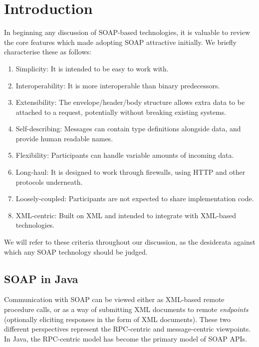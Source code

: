 \section{Introduction}
\label{introduction}

In beginning any discussion of SOAP-based technologies, it is 
valuable to review the core features which made adopting SOAP
attractive initially. We briefly characterise these as follows:

\begin{enumerate}
\item Simplicity: It is intended to be easy to work with.

\item Interoperability: It is more interoperable than binary
predecessors.

\item Extensibility: The envelope/header/body structure
allows extra data to be attached to a request, potentially without
breaking existing systems.

\item Self-describing: Messages can contain type definitions
alongside data, and provide human readable names.

\item Flexibility: Participants can handle variable amounts
of incoming data.

\item Long-haul: It is designed to work through firewalls,
using HTTP and other protocols underneath.

\item Loosely-coupled: Participants are not expected to share
implementation code.

\item XML-centric: Built on XML and intended to integrate with
XML-based technologies.

\end{enumerate}

We will refer to these criteria throughout our discussion, as the
desiderata against which any SOAP technology should be judged.

\subsection{SOAP in Java}
\label{intro:java}

Communication with SOAP can be viewed either as XML-based remote
procedure calls, or as a way of submitting XML documents to remote
\emph{endpoints} (optionally eliciting responses in the form of XML
documents). These two different perspectives represent the RPC-centric
and message-centric viewpoints. In Java, the RPC-centric model has
become the primary model of SOAP APIs.

